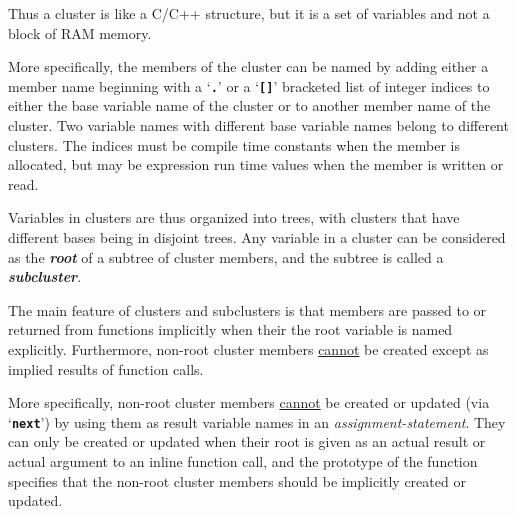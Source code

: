 \documentclass[12pt]{article}
\newcommand{\TT}[1]{{\tt \bfseries #1}}
\newcommand{\key}[1]{{\bf \em #1}\index{#1}}
\newcommand{\mkey}[2]{{\bf \em #1}\index{#1!#2}}
\begin{document}
Thus a cluster
is like a C/C++ structure, but it is a set of variables and not a
block of RAM memory.

More specifically, the members of the cluster can be named by
adding either a member name beginning with a `\TT{.}' or a
`\TT{[]}' bracketed list of
integer indices to
either the base variable name of the cluster or to another member name
of the cluster.  Two variable names with different base variable names
belong to different clusters.  The indices must be compile time
constants when the member is allocated, but may be expression
run time values when the member is written or read.

Variables in clusters are thus organized into trees, with clusters
that have different bases being in disjoint trees.  Any variable in a cluster
can be considered
as the \mkey{root}{of subcluster} of a subtree of cluster members, and
the subtree is called a \key{subcluster}.

The main feature of clusters and subclusters
is that members are passed to or returned
from functions implicitly when their the root variable is named
explicitly.  Furthermore, non-root cluster members \underline{cannot}
be created except as implied results of function calls.

More specifically, non-root cluster members \underline{cannot}
be created or updated (via `\TT{next}')
by using them as result variable names in an
{\em assignment-statement}.  They can only be created or updated
when their root is given as an actual result or actual argument
to an inline function call, and the prototype of the function
specifies that the non-root cluster members should be implicitly created
or updated.
\end{document}
